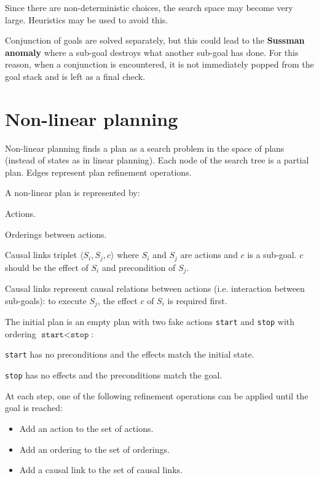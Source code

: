 Since there are non-deterministic choices, the search space may become very large.
Heuristics may be used to avoid this.

Conjunction of goals are solved separately, but this could lead to the  \textbf{Sussman anomaly} 
where a sub-goal destroys what another sub-goal has done.
For this reason, when a conjunction is encountered, it is not immediately popped from the goal stack
and is left as a final check.



\section{Non-linear planning}
Non-linear planning finds a plan as a search problem in the space of plans (instead of states as in linear planning).
Each node of the search tree is a partial plan. Edges represent plan refinement operations.

A non-linear plan is represented by:
\begin{descriptionlist}
    \item[Actions{\normalfont.}] 
    \item[Orderings] 
        between actions.
    \item[Causal links] 
        triplet $\langle S_i, S_j, c \rangle$ where $S_i$ and $S_j$ are actions and $c$ is a sub-goal.
        $c$ should be the effect of $S_i$ and precondition of $S_j$.

        Causal links represent causal relations between actions (i.e. interaction between sub-goals): 
        to execute $S_j$, the effect $c$ of $S_i$ is required first.
\end{descriptionlist}

The initial plan is an empty plan with two fake actions \texttt{start} and \texttt{stop} 
with ordering $\texttt{start} < \texttt{stop}$:
\begin{descriptionlist}
    \item[\texttt{start}] has no preconditions and the effects match the initial state.
    \item[\texttt{stop}] has no effects and the preconditions match the goal.
\end{descriptionlist}
At each step, one of the following refinement operations can be applied until the goal is reached:
\begin{itemize}
    \item Add an action to the set of actions.
    \item Add an ordering to the set of orderings.
    \item Add a causal link to the set of causal links.
\end{itemize}

